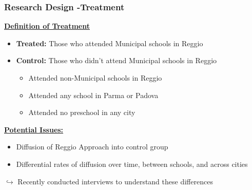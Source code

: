 \begin{frame}
\frametitle{Research Design -Treatment} 
\underline{\textbf{Definition of Treatment}}
\begin{itemize}
	\item \textbf{Treated:} Those who attended Municipal schools in Reggio
	\smallskip
	\item \textbf{Control:} Those who didn't attend Municipal schools in Reggio
	\begin{itemize}
		\item Attended non-Municipal schools in Reggio
		\item Attended any school in Parma or Padova
		\item Attended no preschool in any city
	\end{itemize}
\end{itemize}
\bigskip
\underline{\textbf{Potential Issues:}}
\begin{itemize}
	\item Diffusion of Reggio Approach into control group
	\item Differential rates of diffusion over time, between schools, and across cities
\end{itemize}
\begin{block}{}
$\mathbf{\hookrightarrow}$ Recently conducted interviews to understand these differences
\end{block}

\end{frame}

